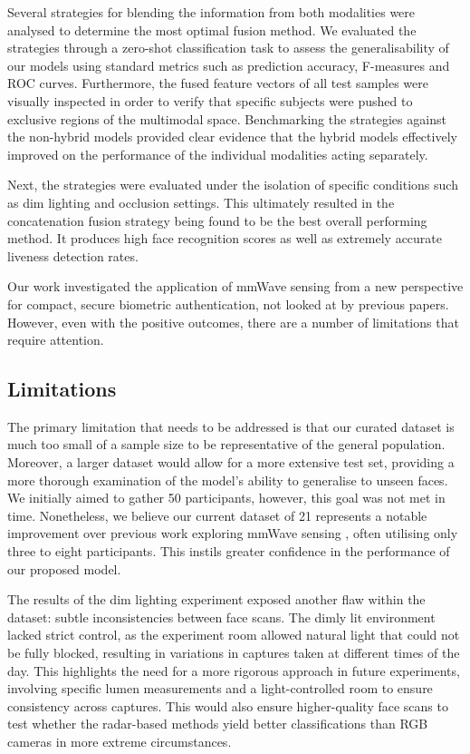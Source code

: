 \documentclass{mpaper}
\begin{document}
Several strategies for blending the information from both modalities were analysed to determine the most optimal fusion method. We evaluated the strategies through a zero-shot classification task to assess the generalisability of our models using standard metrics such as prediction accuracy, F-measures and ROC curves. Furthermore, the fused feature vectors of all test samples were visually inspected in order to verify that specific subjects were pushed to exclusive regions of the multimodal space. Benchmarking the strategies against the non-hybrid models provided clear evidence that the hybrid models effectively improved on the performance of the individual modalities acting separately.

Next, the strategies were evaluated under the isolation of specific conditions such as dim lighting and occlusion settings. This ultimately resulted in the concatenation fusion strategy being found to be the best overall performing method. It produces high face recognition scores as well as extremely accurate liveness detection rates. 

Our work investigated the application of mmWave sensing from a new perspective for compact, secure biometric authentication, not looked at by previous papers. However, even with the positive outcomes, there are a number of limitations that require attention.


\subsection{Limitations}
The primary limitation that needs to be addressed is that our curated dataset is much too small of a sample size to be representative of the general population. Moreover, a larger dataset would allow for a more extensive test set, providing a more thorough examination of the model's ability to generalise to unseen faces. We initially aimed to gather 50 participants, however, this goal was not met in time. Nonetheless, we believe our current dataset of 21 represents a notable improvement over previous work exploring mmWave sensing \cite{lim2020dnn,kim2020face,pho2021radar}, often utilising only three to eight participants. This instils greater confidence in the performance of our proposed model.

The results of the dim lighting experiment exposed another flaw within the dataset: subtle inconsistencies between face scans. The dimly lit environment lacked strict control, as the experiment room allowed natural light that could not be fully blocked, resulting in variations in captures taken at different times of the day. This highlights the need for a more rigorous approach in future experiments, involving specific lumen measurements and a light-controlled room to ensure consistency across captures. This would also ensure higher-quality face scans to test whether the radar-based methods yield better classifications than RGB cameras in more extreme circumstances.
\end{document}
